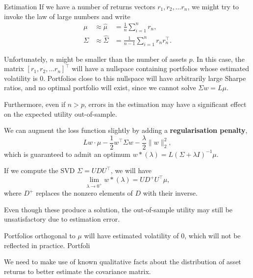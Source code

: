 \documentclass{beamer}
\begin{document}
\begin{frame}{Estimation}
	If we have a number of returns vectors $r_1,r_2,\ldots r_n$, we might try to invoke the law of large numbers and write
	\begin{align*}
		\mu	&\approx \hat{\mu}	&= \frac{1}{n} \sum_{i=1}^n r_n,
	\\	\Sigma	&\approx \hat{\Sigma}	&= \frac{1}{n-1} \sum_{i=1}^n r_n r_n^\top.
	\end{align*}

	Unfortunately, $n$ might be smaller than the number of assets $p$. In this case, the matrix $[r_1,r_2,\ldots r_n]^\top$ will have a nullspace containing portfolios whose estimated volatility is $0$. Portfolios close to this nullspace will have arbitrarily large Sharpe ratios, and no optimal portfolio will exist, since we cannot solve $\Sigma w = L\mu$.

	Furthermore, even if $n>p$, errors in the estimation may have a significant effect on the expected utility out-of-sample.

	We can augment the loss function slightly by adding a \textbf{regularisation penalty},
	$$Lw\cdot\mu-\frac{1}{2}w^\top\Sigma w-\frac{\lambda}{2}\|w\|_2^2,$$
	which is guaranteed to admit an optimum $w*(\lambda) = L(\Sigma+\lambda I)^{-1}\mu$.

	If we compute the SVD $\Sigma=UDU^\top$, we will have
	$$\lim_{\lambda\to 0^+}w*(\lambda) = UD^+U^\top\mu,$$
	where $D^+$ replaces the nonzero elements of $D$ with their inverse.%

	Even though these produce a solution, the out-of-sample utility may still be unsatisfactory due to estimation error.

	Portfolios orthogonal to $\mu$ will have estimated volatility of $0$, which will not be reflected in practice. Portfoli

	We need to make use of known qualitative facts about the distribution of asset returns to better estimate the covariance matrix.
\end{frame}
\end{document}
